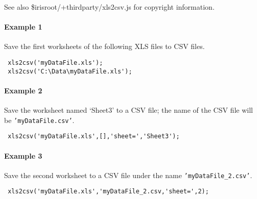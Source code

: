  See also \$irisroot/+thirdparty/xls2csv.js for copyright information.
 
 \paragraph{Example 1}
 
 Save the first worksheets of the following XLS files to CSV files.
 
 \begin{verbatim}
 xls2csv('myDataFile.xls');
 xls2csv('C:\Data\myDataFile.xls');
 \end{verbatim}
 
 \paragraph{Example 2}
 
 Save the worksheet named `Sheet3' to a CSV file; the name of the CSV
 file will be \texttt{'myDataFile.csv'}.
 
 \begin{verbatim}
 xls2csv('myDataFile.xls',[],'sheet=','Sheet3');
 \end{verbatim}
 
 \paragraph{Example 3}
 
 Save the second worksheet to a CSV file under the name
 \texttt{'myDataFile\_2.csv'}.
 
 \begin{verbatim}
 xls2csv('myDataFile.xls','myDataFile_2.csv,'sheet=',2);
 \end{verbatim}


